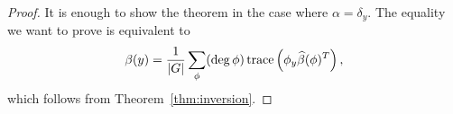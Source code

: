 \begin{proof}
  It is enough to show the theorem in the case where $\alpha=\delta_y$. The equality 
  we want to prove is equivalent to 
  \[
    \beta(y)=\frac{1}{|G|}\sum_{\phi}(\deg\phi)\operatorname{trace}\left(\phi_y\widehat{\beta}(\phi)^T\right),
  \]
  which follows from Theorem~\ref{thm:inversion}.
\end{proof}





